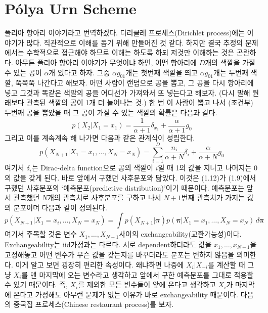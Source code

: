 \documentclass[a4paper, 10pt]{book}
\newcommand{\bs}{\boldsymbol}
\begin{document}
\section{Pólya Urn Scheme}
폴리아 항아리 이야기라고 번역하겠다. 디리클레 프로세스(Dirichlet process)에는 이야기가 많다. 직관적으로 이해를 돕기 위해 만들어진 것 같다. 하지만 결국 추정의 문제에서는 수학적으로 접근해야 하므로 이해는 하도록 하되 저것만 이해하는 것은 곤란하다. 아무튼 폴리아 항아리 이야기가 무엇이냐 하면, 어떤 항아리에 $D$개의 색깔을 가질 수 있는 공이 $\alpha$개 있다고 하자. 그중 $\alpha g_{01}$개는 첫번째 색깔을 띄고 $\alpha g_{01}$개는 두번째 색깔, 쭉쭉쭉 나간다고 해보자. 어떤 사람이 랜덤으로 공을 뽑고, 그 공을 다시 항아리에 넣고 그것과 똑같은 색깔의 공을 어디선가 가져와서 또 넣는다고 해보자. (다시 말해 원래보다 관측된 색깔의 공이 1개 더 늘어나는 것.) 한 번 이 사람이 뽑고 나서 (조건부) 두번째 공을 뽑았을 때 그 공이 가질 수 있는 색깔의 확률은 다음과 같다.
\begin{equation}
  p\left(X_{2}|X_{1}=x_{1}\right) = \frac{1}{\alpha+1}\delta_{x_{1}} + \frac{\alpha}{\alpha+1}g_{0}
\end{equation}
그리고 이를 계속계속 해 나가면 다음과 같은 관계식이 성립한다.
\begin{equation}
  p\left(X_{N+1}|X_{1}=x_{1},\ldots , X_{N}=x_{N}\right) = \sum_{i=1}^{D}\frac{n_{i}}{\alpha+ N}\delta_{i} + \frac{\alpha}{\alpha + N}g_{0}
\end{equation}
여기서 $\delta_{i}$는 Dirac-delta function으로 공의 색깔이 $i$일 때 1의 값을 지니고 나머지는 0의 값을 갖게 된다. 바로 앞에서 구했던 사후분포와 닮았다. 이것은 (1.12)가 (1.9)에서 구했던 사후분포의 `예측분포(predictive distribution)'이기 때문이다. 예측분포는 앞서 관측했던 $N$개의 관측치로 사후분포를 구하고 나서 $N+1$번째 관측치가 가지는 값의 분포이며 다음과 같이 정의된다.
\begin{equation}
  p\left(X_{N+1}|X_{1}=x_{i},\ldots , X_{N}=x_{N}\right)=\int p\left(X_{N+1}|\bs{\pi}\right)p\left(\bs{\pi}|X_{1}=x_{1},\ldots , X_{N}=x_{N}\right)\,d\bs{\pi}
\end{equation}
여기서 주목할 것은 변수 $X_{1},\ldots , X_{N+1}$사이의 exchangeability(교환가능성)이다. Exchangeability는 iid가정과는 다르다. 서로 dependent하더라도 값을 $x_{1},\ldots , x_{N+1}$을 고정해놓고 어떤 변수가 무슨 값을 갖는지를 바꾸더라도 분포는 변하지 않음을 의미한다. 이게 알고 보면 굉장히 편리한 속성이다. 왜냐하면 나중에 $X_{i}|X_{-i}$를 계산할 때 그냥 $X_{i}$를 맨 마지막에 오는 변수라고 생각하고 앞에서 구한 예측분포를 그대로 적용할 수 있기 때문이다. 즉, $X_{i}$를 제외한 모든 변수들이 앞에 온다고 생각하고 $X_{i}$가 마지막에 온다고 가정해도 아무런 문제가 없는 이유가 바로 exchangeability 때문이다. 다음의 중국집 프로세스(Chinese restaurant process)를 보자.
\end{document}
